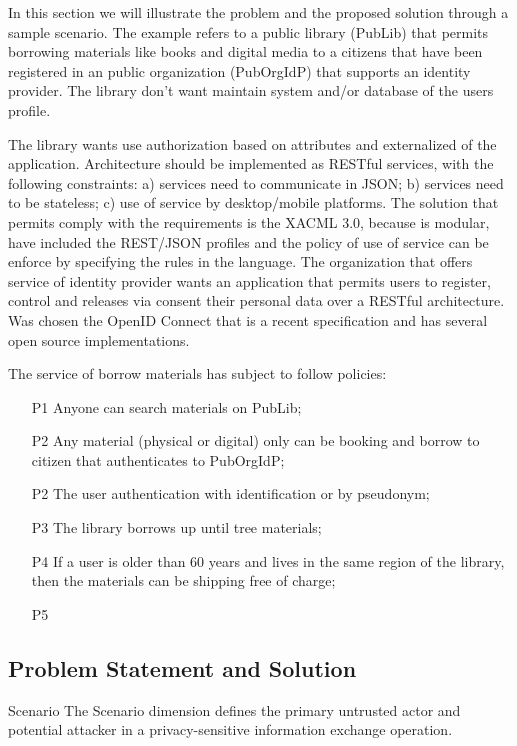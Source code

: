 \documentclass{doublecol-new}
\begin{document}
In this section we will illustrate the problem and the proposed solution through a sample scenario. The example refers to a public library (PubLib) that permits borrowing materials like books and digital media to a citizens that have been registered in an public organization (PubOrgIdP) that supports an identity provider. The library don't want maintain system and/or database of the users profile.

The library wants use authorization based on attributes and externalized of the application. Architecture should be implemented as RESTful services, with the following constraints: a) services need to communicate in JSON; b) services need to be stateless; c) use of service by desktop/mobile platforms. The solution that permits comply with the requirements is the XACML 3.0, because is modular, have included the REST/JSON profiles and the policy of use of service can be enforce by specifying the rules in the language. The organization that offers service of identity provider wants an application that permits users to register, control and releases via consent their personal data over a RESTful architecture. Was chosen the OpenID Connect that is a recent specification and has several open source implementations.

The service of borrow materials has subject to follow policies:
\begin{enumerate}
	\item [P1] Anyone can search materials on PubLib;	
	\item [P2] Any material (physical or digital) only can be booking and borrow to citizen that authenticates to PubOrgIdP;
	\item [P2] The user  authentication with identification or by pseudonym;
	\item [P3] The library borrows up until tree materials;
	\item [P4] If a user is older than 60 years and lives in the same region of the library, then the materials can be shipping free of charge;
	\item [P5] 
\end{enumerate}



\subsection[sec:problemstatement]{Problem Statement and Solution}

Scenario The Scenario dimension defines the primary untrusted actor and potential attacker in a privacy-sensitive information exchange operation.
\end{document}
